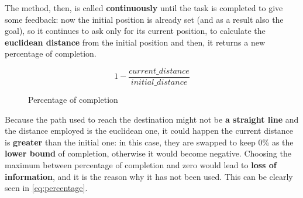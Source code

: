 The  method, then, is called \textbf{continuously} until the task is completed to give some feedback: now the initial position is already set (and as a result also the goal), so it continues to ask only for its current position, to calculate the \textbf{euclidean distance} from the initial position and then, it returns a new percentage of completion.

\begin{wrapfigure}{r}{0.25\textwidth}
    \begin{equation*}
        1-\dfrac{current\_distance}{initial\_distance}
    \end{equation*}
    \caption{Percentage of completion}
    \label{eq:percentage}
\end{wrapfigure} 

Because the path used to reach the destination might not be \textbf{a straight line} and the distance employed is the euclidean one, it could happen the current distance is \textbf{greater} than the initial one: 
in this case, they are swapped to keep 0\% as the \textbf{lower bound} of completion, otherwise it would become negative. Choosing the maximum between percentage of completion and zero would lead to \textbf{loss of information}, and it is the reason why it has not been used. This can be clearly seen in \autoref{eq:percentage}.
